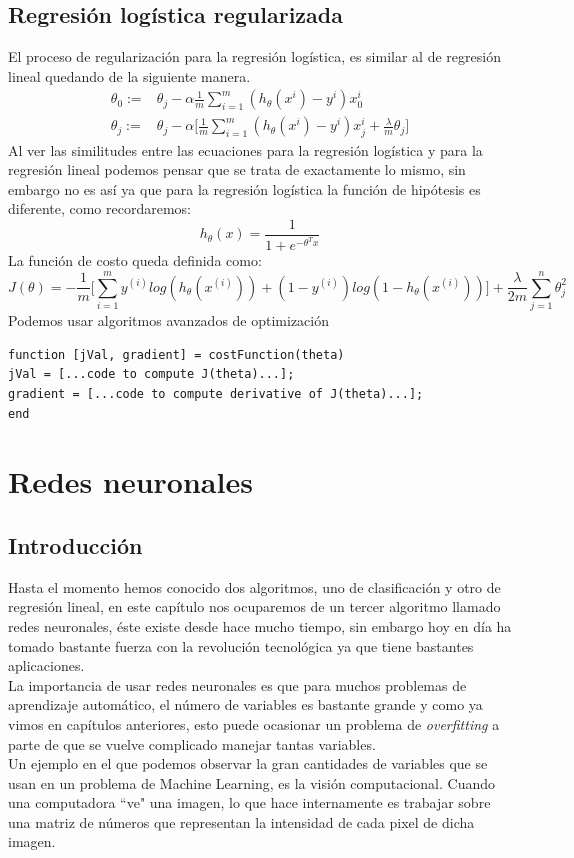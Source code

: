 \documentclass{report}
\begin{document}
\section{Regresión logística regularizada}
El proceso de regularización para la regresión logística, es similar al de regresión lineal quedando de la siguiente manera.
\begin{align*}
\theta_0:=&\theta_j-\alpha\frac{1}{m}\sum_{i=1}^{m}(h_\theta(x^i)-y^i)x_0^i\\
\theta_j:=&\theta_j-\alpha\Bigg[\frac{1}{m}\sum_{i=1}^{m}(h_\theta(x^i)-y^i)x_j^i+\frac{\lambda}{m}\theta_j\Bigg]
\end{align*}
Al ver las similitudes entre las ecuaciones para la regresión logística y para la regresión lineal podemos pensar que se trata de exactamente lo mismo, sin embargo no es así ya que para la regresión logística la función de hipótesis es diferente, como recordaremos:
\[
h_\theta(x)=\frac{1}{1+e^{-\theta^Tx}}
\]La función de costo queda definida como:
\[
J(\theta)=-\frac{1}{m}\Bigg[\sum_{i=1}^{m}y^{(i)}log(h_\theta(x^{(i)}))+(1-y^{(i)})log(1-h_\theta(x^{(i)}))\Bigg]+\frac{\lambda}{2m}\sum_{j=1}^{n}\theta^2_j
\]
Podemos usar algoritmos avanzados de optimización
\begin{lstlisting}[frame=single]
function [jVal, gradient] = costFunction(theta)
jVal = [...code to compute J(theta)...];
gradient = [...code to compute derivative of J(theta)...];
end
\end{lstlisting}

\chapter{Redes neuronales}
\section{Introducción}

Hasta el momento hemos conocido dos algoritmos, uno de clasificación y otro de regresión lineal, en este capítulo nos ocuparemos de un tercer algoritmo llamado redes neuronales, éste existe desde hace mucho tiempo, sin embargo hoy en día ha tomado bastante fuerza con la revolución tecnológica ya que tiene bastantes aplicaciones.\\

La importancia de usar redes neuronales es que para muchos problemas de aprendizaje automático, el número de variables es bastante grande y como ya vimos en capítulos anteriores, esto puede ocasionar un problema de \textit{overfitting} a parte de que se vuelve complicado manejar tantas variables.\\ Un ejemplo en el que podemos observar la gran cantidades de variables que se usan en un problema de Machine Learning, es la visión computacional. Cuando una computadora ``ve" una imagen, lo que hace internamente es trabajar sobre una matriz de números que representan la intensidad de cada pixel de dicha imagen. \\
\end{document}
